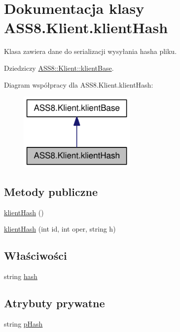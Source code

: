 \hypertarget{a00008}{
\section{Dokumentacja klasy ASS8.Klient.klientHash}
\label{d4/dee/a00008}
}
Klasa zawiera dane do serializacji wysyłania hasha pliku.  


Dziedziczy \hyperlink{a00007}{ASS8::Klient::klientBase}.

Diagram współpracy dla ASS8.Klient.klientHash:\nopagebreak
\begin{figure}[H]
\begin{center}
\leavevmode
\includegraphics[width=162pt]{dd/de3/a00201}
\end{center}
\end{figure}
\subsection*{Metody publiczne}
\begin{CompactItemize}
\item 
\hyperlink{a00008_6c9be19f6d58c4e42d82c298f9cdb3e8}{klientHash} ()
\item 
\hyperlink{a00008_41ce9f388ec0f731d80ebec886f7b4b2}{klientHash} (int id, int oper, string h)
\end{CompactItemize}
\subsection*{Właściwości}
\begin{CompactItemize}
\item 
string \hyperlink{a00008_5a3e998f66ab41fb3d9be69da9f6957d}{hash}
\end{CompactItemize}
\subsection*{Atrybuty prywatne}
\begin{CompactItemize}
\item 
string \hyperlink{a00008_0dba6fe0451b6d3b95cea1b021233229}{pHash}
\end{CompactItemize}


